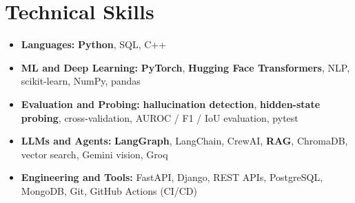 \documentclass[letterpaper,10pt]{article}
\begin{document}
\section{Technical Skills}
\begin{itemize}[label={},leftmargin=0.15in]\small
  \item \textbf{Languages:} \textbf{Python}, SQL, C++
  \item \textbf{ML and Deep Learning:} \textbf{PyTorch}, \textbf{Hugging Face Transformers}, NLP, scikit-learn, NumPy, pandas
  \item \textbf{Evaluation and Probing:} \textbf{hallucination detection}, \textbf{hidden-state probing}, cross-validation, AUROC / F1 / IoU evaluation, pytest
  \item \textbf{LLMs and Agents:} \textbf{LangGraph}, LangChain, CrewAI, \textbf{RAG}, ChromaDB, vector search, Gemini vision, Groq
  \item \textbf{Engineering and Tools:} FastAPI, Django, REST APIs, PostgreSQL, MongoDB, Git, GitHub Actions (CI/CD)
\end{itemize}
\end{document}
